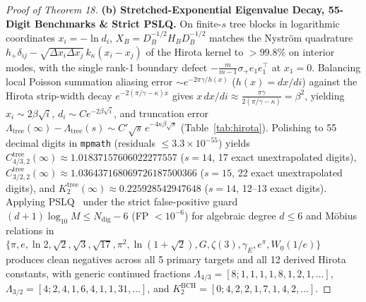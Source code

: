 \documentclass[10pt,letterpaper]{article}
\begin{document}
\begin{proof}[Proof of Theorem 18]
\textbf{(b) Stretched-Exponential Eigenvalue Decay, 55-Digit Benchmarks \& Strict PSLQ.}
On finite-$s$ tree blocks in logarithmic coordinates $x_i = -\ln d_i$, $X_B = D_B^{-1/2} H_B D_B^{-1/2}$ matches the Nystr\"om quadrature $h_+\delta_{ij} - \sqrt{\Delta x_i \Delta x_j}\,k_\kappa(x_i - x_j)$ of the Hirota kernel to $>99.8\%$ on interior modes, with the single rank-1 boundary defect $-\frac{m}{m-1}\sigma_+ e_1 e_1^\top$ at $x_1 = 0$. Balancing local Poisson summation aliasing error $\sim e^{-2\pi\gamma/h(x)}$ ($h(x) = dx/di$) against the Hirota strip-width decay $e^{-2(\pi/\gamma - \kappa)x}$ gives $x\,dx/di \approx \frac{\pi\gamma}{2(\pi/\gamma - \kappa)} = \beta^2$, yielding $x_i \sim 2\beta\sqrt{i}$, $d_i \sim C e^{-2\beta\sqrt{i}}$, and truncation error $\Lambda_{\mathrm{tree}}(\infty) - \Lambda_{\mathrm{tree}}(s) \sim C'\sqrt{s}\,e^{-4\kappa\beta\sqrt{s}}$ (Table~\ref{tab:hirota}). Polishing to 55 decimal digits in \texttt{mpmath} (residuals $\le 3.3\times 10^{-55}$) yields $C_{4/3,2}^{\mathrm{tree}}(\infty) \approx 1.01837157606022277557$ ($s=14$, 17 exact unextrapolated digits), $C_{3/2,2}^{\mathrm{tree}}(\infty) \approx 1.036437168069726187500366$ ($s=15$, 22 exact unextrapolated digits), and $K_2^{\mathrm{tree}}(\infty) \approx 0.225928542947648$ ($s=14$, 12--13 exact digits). Applying PSLQ~\cite{FergusonBaileyArno1999} under the strict false-positive guard $(d+1)\log_{10} M \le N_{\mathrm{dig}} - 6$ (FP $< 10^{-6}$) for algebraic degree $d \le 6$ and M\"obius relations in $\{\pi, e, \ln 2, \sqrt{2}, \sqrt{3}, \sqrt{17}, \pi^2, \ln(1+\sqrt{2}), G, \zeta(3), \gamma_E, e^\pi, W_0(1/e)\}$ produces clean negatives across all 5 primary targets and all 12 derived Hirota constants, with generic continued fractions $\Lambda_{4/3} = [8;1,1,1,1,8,1,2,1,\dots]$, $\Lambda_{3/2} = [4;2,4,1,6,4,1,1,31,\dots]$, and $K_2^{\mathrm{BCH}} = [0;4,2,2,1,7,1,4,2,\dots]$.
\end{proof}
\end{document}
